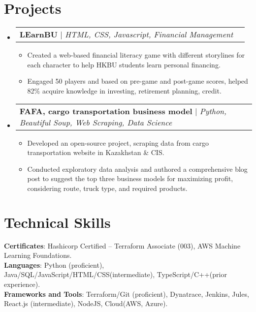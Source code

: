\documentclass[letterpaper,10pt]{article}
\makeatletter
\newcommand{\resumeItem}[1]{
  \item\small{
    {#1 \vspace{-2pt}}
  }
}
\newcommand{\resumeSubSubheading}[2]{
    \item
    \begin{tabular*}{1\textwidth}{l@{\extracolsep{\fill}}r}
      \textit{\small#1} & \textit{\small #2} \\
    \end{tabular*}\vspace{-7pt}
}
\newcommand{\resumeProjectHeading}[2]{
    \item
    \begin{tabular*}{1\textwidth}{l@{\extracolsep{\fill}}r}
      \small#1 & #2 \\
    \end{tabular*}\vspace{-7pt}
}
\newcommand{\resumeSubHeadingListStart}{\begin{itemize}[leftmargin=0.0in, label={}]}
\newcommand{\resumeSubHeadingListEnd}{\end{itemize}}
\newcommand{\resumeItemListStart}{\begin{itemize}}
\newcommand{\resumeItemListEnd}{\end{itemize}\vspace{-5pt}}
\makeatother
\begin{document}

\section{Projects}
    \resumeSubHeadingListStart
      \resumeProjectHeading
          {\textbf{LEarnBU} $|$ \emph{HTML, CSS, Javascript, Financial Management}}{}
          \resumeItemListStart
            \resumeItem{Created a web-based financial literacy game with different storylines for each character to help HKBU students learn personal financing. }
            \resumeItem{Engaged 50 players and based on pre-game and post-game scores, helped 82\% acquire knowledge in investing, retirement planning, credit.}
          \resumeItemListEnd
      \resumeProjectHeading
          {\textbf{FAFA, cargo transportation business model} $|$ \emph{Python, Beautiful Soup, Web Scraping, Data Science}}{}
          \resumeItemListStart
            \resumeItem{Developed an open-source project, scraping data from cargo transportation website in Kazakhstan \& CIS.}
            \resumeItem{Conducted exploratory data analysis and authored a comprehensive blog post to suggest the top three business models for maximizing profit, considering route, truck type, and required products.}
          \resumeItemListEnd
    \resumeSubHeadingListEnd
%
\section{Technical Skills}
 \begin{itemize}[leftmargin=0.0in, label={}]
    \small{\item{
     \textbf{Certificates}{: Hashicorp Certified – Terraform Associate (003), AWS Machine Learning Foundations.} \\
     \textbf{Languages}{: Python (proficient), Java/SQL/JavaScript/HTML/CSS(intermediate), TypeScript/C++(prior experience).} \\
     \textbf{Frameworks and Tools}{: Terraform/Git (proficient), Dynatrace, Jenkins, Jules, React.js (intermediate), NodeJS, Cloud(AWS, Azure).}} \\}
 \end{itemize}


\end{document}
